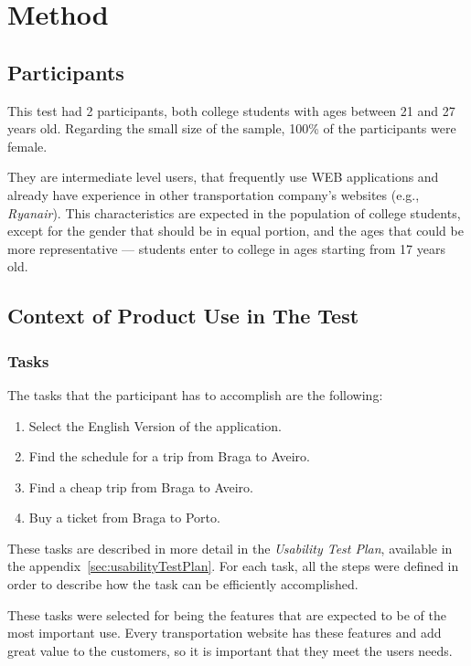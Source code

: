 \documentclass[a4paper]{article}
\begin{document}
\section{Method}

\subsection{Participants}

This test had 2 participants, both college students with ages between 21 and 27 years old. Regarding the small size of the sample, 100\% of the participants were female.

They are intermediate level users, that frequently use WEB applications and already have experience in other transportation company's websites (e.g., \emph{Ryanair}). This characteristics are expected in the population of college students, except for the gender that should be in equal portion, and the ages that could be more representative --- students enter to college in ages starting from 17 years old.

\subsection{Context of Product Use in The Test}
\subsubsection{Tasks}
\label{sec:tasks}
The tasks that the participant has to accomplish are the following:

\begin{enumerate}
  \item Select the English Version of the application.
  \item Find the schedule for a trip from Braga to Aveiro.
  \item Find a cheap trip from Braga to Aveiro.
  \item Buy a ticket from Braga to Porto.
\end{enumerate}

These tasks are described in more detail in the \emph{Usability Test Plan}, available in the appendix~\ref{sec:usabilityTestPlan}. For each task, all the steps were defined in order to describe how the task can be efficiently accomplished.

These tasks were selected for being the features that are expected to be of the most important use. Every transportation website has these features and add great value to the customers, so it is important that they meet the users needs.
\end{document}
